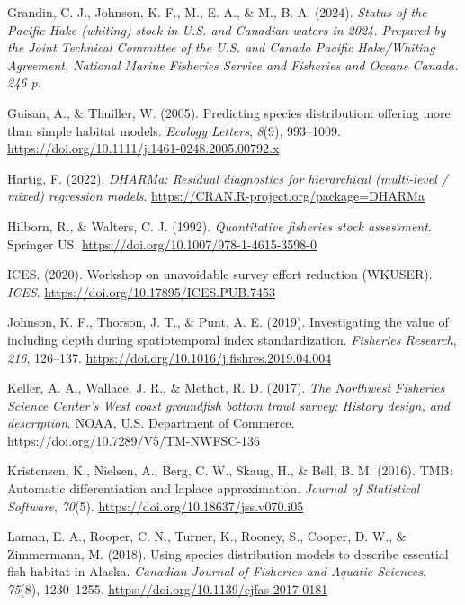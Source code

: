 \documentclass[
]{article}
\newlength{\cslhangindent}
\newenvironment{CSLReferences}[2] %
 {\begin{list}{}{%
  \setlength{\itemindent}{0pt}
  \setlength{\leftmargin}{0pt}
  \setlength{\parsep}{0pt}
  \ifodd #1
   \setlength{\leftmargin}{\cslhangindent}
   \setlength{\itemindent}{-1\cslhangindent}
  \fi
  \setlength{\itemsep}{#2\baselineskip}}}
 {\end{list}}
\begin{document}
\begin{CSLReferences}{1}{0}
Grandin, C. J., Johnson, K. F., M., E. A., \& M., B. A. (2024).
\emph{{Status of the Pacific Hake (whiting) stock in U.S. and Canadian
waters in 2024. Prepared by the Joint Technical Committee of the U.S.
and Canada Pacific Hake/Whiting Agreement, National Marine Fisheries
Service and Fisheries and Oceans Canada. 246 p.}}

Guisan, A., \& Thuiller, W. (2005). {Predicting species distribution:
offering more than simple habitat models}. \emph{Ecology Letters},
\emph{8}(9), 993--1009.
\url{https://doi.org/10.1111/j.1461-0248.2005.00792.x}

Hartig, F. (2022). \emph{{DHARMa: Residual diagnostics for hierarchical
(multi-level / mixed) regression models}}.
\url{https://CRAN.R-project.org/package=DHARMa}

Hilborn, R., \& Walters, C. J. (1992). \emph{{Quantitative fisheries
stock assessment}}. Springer US.
\url{https://doi.org/10.1007/978-1-4615-3598-0}

ICES. (2020). {Workshop on unavoidable survey effort reduction
(WKUSER)}. \emph{ICES}. \url{https://doi.org/10.17895/ICES.PUB.7453}

Johnson, K. F., Thorson, J. T., \& Punt, A. E. (2019). {Investigating
the value of including depth during spatiotemporal index
standardization}. \emph{Fisheries Research}, \emph{216}, 126--137.
\url{https://doi.org/10.1016/j.fishres.2019.04.004}

Keller, A. A., Wallace, J. R., \& Methot, R. D. (2017). \emph{{The
Northwest Fisheries Science Center's West coast groundfish bottom trawl
survey: History design, and description}}. NOAA, U.S. Department of
Commerce. \url{https://doi.org/10.7289/V5/TM-NWFSC-136}

Kristensen, K., Nielsen, A., Berg, C. W., Skaug, H., \& Bell, B. M.
(2016). {TMB: Automatic differentiation and laplace approximation}.
\emph{Journal of Statistical Software}, \emph{70}(5).
\url{https://doi.org/10.18637/jss.v070.i05}

Laman, E. A., Rooper, C. N., Turner, K., Rooney, S., Cooper, D. W., \&
Zimmermann, M. (2018). {Using species distribution models to describe
essential fish habitat in Alaska}. \emph{Canadian Journal of Fisheries
and Aquatic Sciences}, \emph{75}(8), 1230--1255.
\url{https://doi.org/10.1139/cjfas-2017-0181}


\end{CSLReferences}
\end{document}
